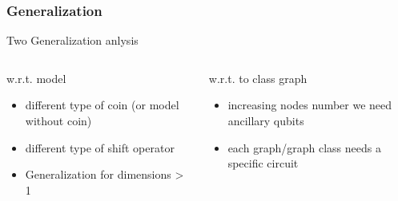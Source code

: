 \documentclass{beamer}
\begin{document}
\begin{frame}
    \frametitle{Generalization}
    Two Generalization anlysis
    \begin{columns}[T]
        \begin{column}{.5\textwidth}
            \begin{block}{w.r.t. model}
                \begin{itemize}
                    \item different type of coin (or model without coin)
                    \item different type of shift operator
                    \item Generalization for dimensions > 1
                \end{itemize}
            \end{block}
        \end{column}
        \begin{column}{.5\textwidth}
            \begin{block}{w.r.t. to class graph}
                \begin{itemize}
                    \item increasing nodes number we need ancillary qubits
                    \item each graph/graph class needs a specific circuit 
                \end{itemize}
            \end{block}
        \end{column}
    \end{columns}
    
\end{frame}
\end{document}
